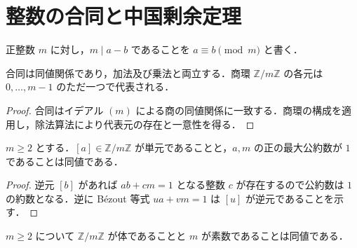 \section{整数の合同と中国剰余定理}
\begin{defn}[整数の合同]
正整数 $m$ に対し，$m\mid a-b$ であることを $a\equiv b\pmod m$ と書く．
\end{defn}
\begin{prop}[剰余類環]
合同は同値関係であり，加法及び乗法と両立する．商環 $\mathbb Z/m\mathbb Z$ の各元は $0,\ldots,m-1$ のただ一つで代表される．
\end{prop}
\begin{proof}
合同はイデアル $(m)$ による商の同値関係に一致する．商環の構成を適用し，除法算法により代表元の存在と一意性を得る．
\end{proof}
\begin{prop}[剰余類の単元判定]
$m\geq2$ とする．$[a]\in\mathbb Z/m\mathbb Z$ が単元であることと，$a,m$ の正の最大公約数が $1$ であることは同値である．
\end{prop}
\begin{proof}
逆元 $[b]$ があれば $ab+cm=1$ となる整数 $c$ が存在するので公約数は $1$ の約数となる．逆に Bézout 等式 $ua+vm=1$ は $[u]$ が逆元であることを示す．
\end{proof}
\begin{prop}[素数の剰余体]
$m\geq2$ について $\mathbb Z/m\mathbb Z$ が体であることと $m$ が素数であることは同値である．
\end{prop}

